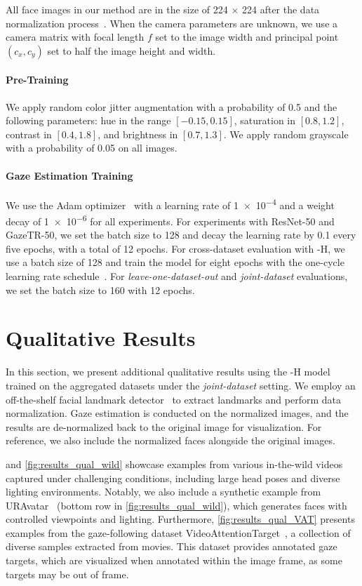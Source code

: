 All face images in our method are in the size of \num{224} $\times$ \num{224} after the data normalization process~\cite{zhang2018revisiting}.
When the camera parameters are unknown, we use a camera matrix with focal length $f$ set to the image width and principal point $(c_x, c_y)$ set to half the image height and width.

\paragraph{Pre-Training}
We apply random color jitter augmentation with a probability of 0.5 and the following parameters: hue in the range $[-0.15, 0.15]$, saturation in $[0.8, 1.2]$, contrast in $[0.4, 1.8]$, and brightness in $[0.7, 1.3]$.
We apply random grayscale with a probability of 0.05 on all images.

\paragraph{Gaze Estimation Training}

We use the Adam optimizer~\cite{kingma2014adam} with a learning rate of \num{1e-4} and a weight decay of \num{1e-6} for all experiments.
For experiments with ResNet-50 and GazeTR-50, we set the batch size to 128 and decay the learning rate by 0.1 every five epochs, with a total of 12 epochs.
For cross-dataset evaluation with \methodname-H, we use a batch size of 128 and train the model for eight epochs with the one-cycle learning rate schedule~\cite{smith2019super}.
For \textit{leave-one-dataset-out} and \textit{joint-dataset} evaluations, we set the batch size to 160 with 12 epochs.

\section{Qualitative Results}
In this section, we present additional qualitative results using the \methodname-H model trained on the aggregated datasets under the \textit{joint-dataset} setting. 
We employ an off-the-shelf facial landmark detector~\cite{bulat2017far} to extract landmarks and perform data normalization.
Gaze estimation is conducted on the normalized images, and the results are de-normalized back to the original image for visualization.
For reference, we also include the normalized faces alongside the original images.

 and \cref{fig:results_qual_wild} showcase examples from various in-the-wild videos captured under challenging conditions, including large head poses and diverse lighting environments.
Notably, we also include a synthetic example from URAvatar~\cite{li2024uravatar} (bottom row in \cref{fig:results_qual_wild}), which generates faces with controlled viewpoints and lighting.
Furthermore, \cref{fig:results_qual_VAT} presents examples from the gaze-following dataset VideoAttentionTarget~\cite{chong2020detecting}, a collection of diverse samples extracted from movies. 
This dataset provides annotated gaze targets, which are visualized when annotated within the image frame, as some targets may be out of frame.

